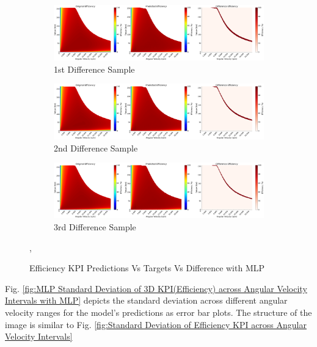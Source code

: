 \documentclass{report} %
\begin{document}
\begin{figure}[H]
    \centering
    \begin{subfigure}{1\textwidth}
        \centering
        \includegraphics[width=1\textwidth]{./ReportImages/evalkpi3dprediction1.png} 
        \caption{1st Difference Sample} 
        \label{fig:1st Difference Sample}
    \end{subfigure}\hfill
    \begin{subfigure}{1\textwidth}
        \centering
        \includegraphics[width=1\textwidth]{./ReportImages/evalkpi3dprediction2.png} 
        \caption{2nd Difference Sample} 
        \label{fig:2nd Difference Sample}
    \end{subfigure}\hfill
    \begin{subfigure}{1\textwidth}
        \centering
        \includegraphics[width=1\textwidth]{./ReportImages/evalkpi3dprediction3.png} 
        \caption{3rd Difference Sample} 
        \label{fig:3rd Difference Sample}
    \end{subfigure}
    \caption{Efficiency \ac{KPI} Predictions Vs Targets Vs Difference with \ac{MLP}},
    \label{fig:Efficiency KPI Predictions Vs Targets Vs Difference with MLP}
\end{figure} 

Fig. \ref{fig:MLP Standard Deviation of 3D KPI(Efficiency) across Angular Velocity Intervals with MLP} depicts the standard deviation across different 
angular velocity ranges for the model's predictions as error bar plots. The structure of the image is similar to Fig. 
\ref{fig:Standard Deviation of Efficiency KPI across Angular Velocity Intervals}
\end{document}
